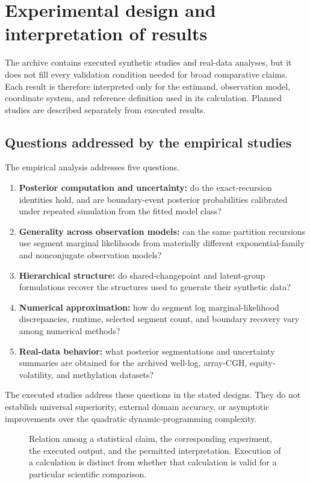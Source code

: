 \section{Experimental design and interpretation of results}
\label{sec:experimental-design}

The archive contains executed synthetic studies and real-data analyses, but it does not fill every validation condition needed for broad comparative claims. Each result is therefore interpreted only for the estimand, observation model, coordinate system, and reference definition used in its calculation. Planned studies are described separately from executed results.

\subsection{Questions addressed by the empirical studies}
The empirical analysis addresses five questions.
\begin{enumerate}
\item \textbf{Posterior computation and uncertainty:} do the exact-recursion identities hold, and are boundary-event posterior probabilities calibrated under repeated simulation from the fitted model class?
\item \textbf{Generality across observation models:} can the same partition recursions use segment marginal likelihoods from materially different exponential-family and nonconjugate observation models?
\item \textbf{Hierarchical structure:} do shared-changepoint and latent-group formulations recover the structures used to generate their synthetic data?
\item \textbf{Numerical approximation:} how do segment log marginal-likelihood discrepancies, runtime, selected segment count, and boundary recovery vary among numerical methods?
\item \textbf{Real-data behavior:} what posterior segmentations and uncertainty summaries are obtained for the archived well-log, array-CGH, equity-volatility, and methylation datasets?
\end{enumerate}
The executed studies address these questions in the stated designs. They do not establish universal superiority, external domain accuracy, or asymptotic improvements over the quadratic dynamic-programming complexity.

\begin{figure}[t]
  \centering
  \resizebox{0.91\textwidth}{!}{}
  \caption{Relation among a statistical claim, the corresponding experiment, the executed output, and the permitted interpretation. Execution of a calculation is distinct from whether that calculation is valid for a particular scientific comparison.}
  \label{fig:claim-evidence-paper}
\end{figure}

